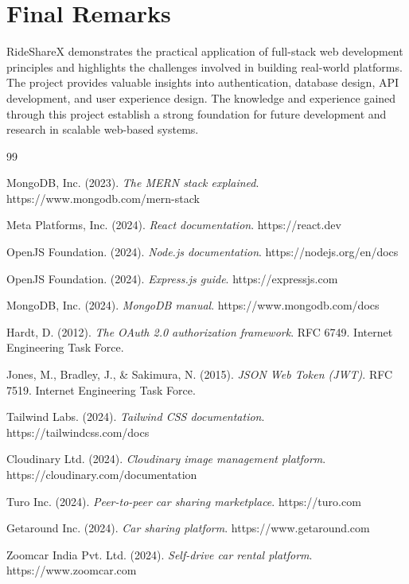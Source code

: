 \documentclass[12pt,a4paper]{report}
\begin{document}
\section{Final Remarks}

RideShareX demonstrates the practical application of full-stack web development principles and highlights the challenges involved in building real-world platforms. The project provides valuable insights into authentication, database design, API development, and user experience design. The knowledge and experience gained through this project establish a strong foundation for future development and research in scalable web-based systems.


\begin{thebibliography}{99}

MongoDB, Inc. (2023).
\textit{The MERN stack explained}.
https://www.mongodb.com/mern-stack

Meta Platforms, Inc. (2024).
\textit{React documentation}.
https://react.dev

OpenJS Foundation. (2024).
\textit{Node.js documentation}.
https://nodejs.org/en/docs

OpenJS Foundation. (2024).
\textit{Express.js guide}.
https://expressjs.com

MongoDB, Inc. (2024).
\textit{MongoDB manual}.
https://www.mongodb.com/docs

Hardt, D. (2012).
\textit{The OAuth 2.0 authorization framework}.
RFC 6749.
Internet Engineering Task Force.

Jones, M., Bradley, J., \& Sakimura, N. (2015).
\textit{JSON Web Token (JWT)}.
RFC 7519.
Internet Engineering Task Force.

Tailwind Labs. (2024).
\textit{Tailwind CSS documentation}.
https://tailwindcss.com/docs

Cloudinary Ltd. (2024).
\textit{Cloudinary image management platform}.
https://cloudinary.com/documentation

Turo Inc. (2024).
\textit{Peer-to-peer car sharing marketplace}.
https://turo.com

Getaround Inc. (2024).
\textit{Car sharing platform}.
https://www.getaround.com

Zoomcar India Pvt. Ltd. (2024).
\textit{Self-drive car rental platform}.
https://www.zoomcar.com


\end{thebibliography}
\end{document}
